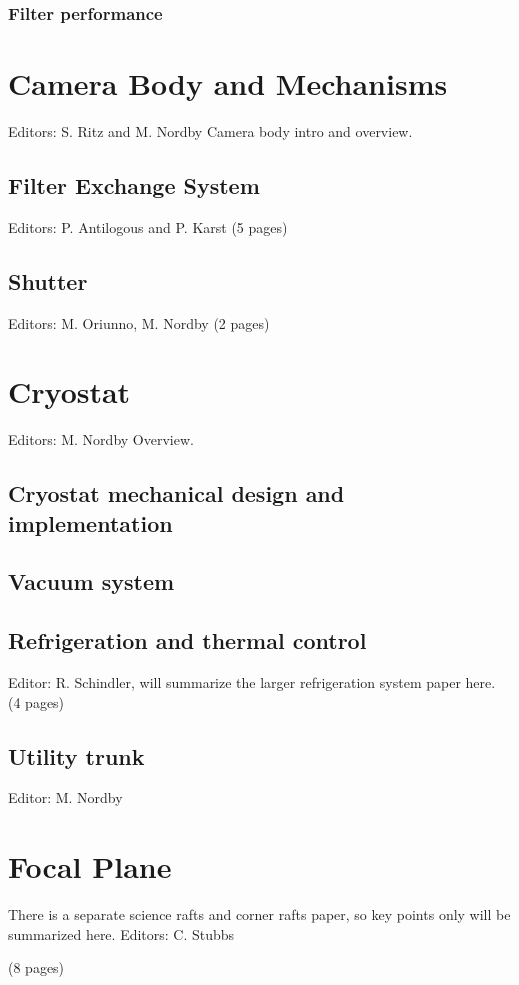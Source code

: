 \subsubsection{Filter performance}

\section{Camera Body and Mechanisms}
Editors: S. Ritz and M. Nordby 
Camera body intro and overview.

\subsection{Filter Exchange System}
Editors: P. Antilogous and P. Karst
(5 pages)

\subsection{Shutter}
Editors: M. Oriunno, M. Nordby
(2 pages)

\section{Cryostat}
Editors: M. Nordby
Overview.
\subsection{Cryostat mechanical design and implementation}
\subsection{Vacuum system}
\subsection{Refrigeration and thermal control}
Editor: R. Schindler, will summarize the larger refrigeration system paper here.
(4 pages)
\subsection{Utility trunk}
Editor: M. Nordby

\section{Focal Plane}
There is a separate science rafts and corner rafts paper, so key points only will be summarized here.
Editors: C. Stubbs

(8 pages)


